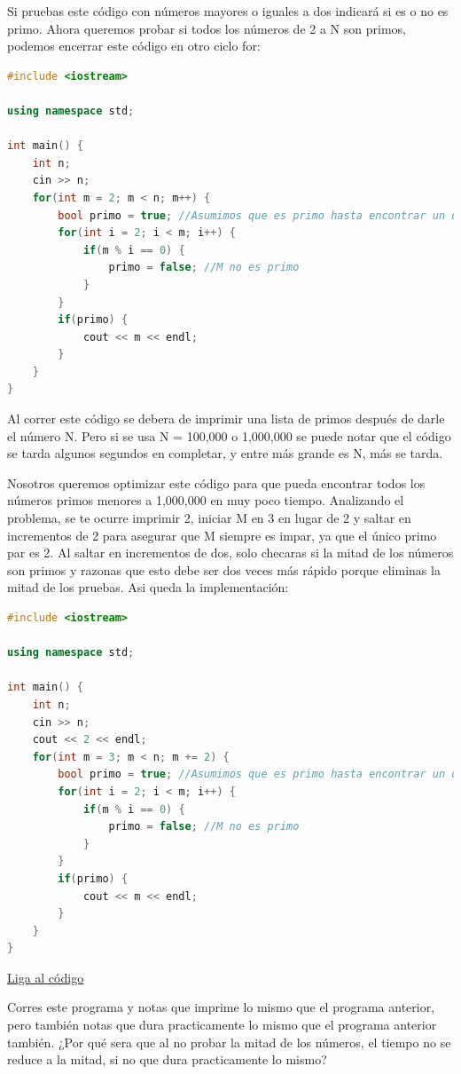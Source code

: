 \documentclass{article}
\begin{document}
Si pruebas este código con números mayores o iguales a dos indicará si es o no es primo. Ahora queremos probar si todos los números de 2 a N son primos, podemos encerrar este código en otro ciclo for:

\begin{lstlisting}[language=C++, caption=Encontrando primos menores que N]
#include <iostream>

using namespace std;

int main() {
    int n;
    cin >> n;
    for(int m = 2; m < n; m++) {
        bool primo = true; //Asumimos que es primo hasta encontrar un divisor
        for(int i = 2; i < m; i++) {
            if(m % i == 0) {
                primo = false; //M no es primo
            }
        }
        if(primo) {
            cout << m << endl;
        }
    }
}
\end{lstlisting}

Al correr este código se debera de imprimir una lista de primos después de darle el número N. Pero si se usa N = 100,000 o 1,000,000 se puede notar que el código se tarda algunos segundos en completar, y entre más grande es N, más se tarda.

Nosotros queremos optimizar este código para que pueda encontrar todos los números primos menores a 1,000,000 en muy poco tiempo. Analizando el problema, se te ocurre imprimir 2, iniciar M en 3 en lugar de 2 y saltar en incrementos de 2 para asegurar que M siempre es impar, ya que el único primo par es 2. Al saltar en incrementos de dos, solo checaras si la mitad de los números son primos y razonas que esto debe ser dos veces más rápido porque eliminas la mitad de los pruebas. Asi queda la implementación:

\begin{lstlisting}[language=C++, caption=¿Optimizando?]
#include <iostream>

using namespace std;

int main() {
    int n;
    cin >> n;
    cout << 2 << endl;
    for(int m = 3; m < n; m += 2) {
        bool primo = true; //Asumimos que es primo hasta encontrar un divisor
        for(int i = 2; i < m; i++) {
            if(m % i == 0) {
                primo = false; //M no es primo
            }
        }
        if(primo) {
            cout << m << endl;
        }
    }
}
\end{lstlisting}
\href{https://repl.it/@Jamesscn/Programa-ineficiente}{Liga al código}

Corres este programa y notas que imprime lo mismo que el programa anterior, pero también notas que dura practicamente lo mismo que el programa anterior también. ¿Por qué sera que al no probar la mitad de los números, el tiempo no se reduce a la mitad, si no que dura practicamente lo mismo?
\end{document}
